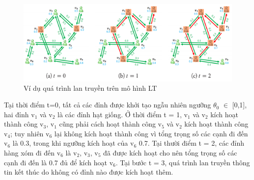 	\begin{center}
		\begin{figure}[H]
			\begin{center}
				\includegraphics [scale=1]{picture/Hinh2_2}
			\end{center}
			\caption{Ví dụ quá trình lan truyền trên mô hình LT}
			\label{refhinh2_2}
		\end{figure}
	\end{center}	
	Tại thời điểm t=0, tất cả các đỉnh được khởi tạo ngẫu nhiên ngưỡng $\theta$$_{0}$ $\in$ [0,1], hai đỉnh v$_{1}$ và v$_{2}$ là các đỉnh hạt giống. Ở thời điểm t = 1, v$_{1}$ và v$_{2}$ kích hoạt thành công v$_{3}$, v$_{1}$ cũng phải cách hoạt thành công v$_{5}$ và v$_{2}$ kích hoạt thành công v$_{4}$; tuy nhiên v$_{6}$ lại không kích hoạt thành công vì tổng trọng số các cạnh đi đến v$_{6}$ là 0.3, trong khi ngưỡng kích hoạt của v$_{6}$ 0.7. Tại thười điểm t = 2, các đỉnh hàng xóm đi đến v$_{6}$ là v$_{2}$, v$_{3}$, v$_{5}$ đã được kích hoạt cho nên tổng trọng số các cạnh đi đến là 0.7 đủ để kích hoạt v$_{6}$. Tại bước t = 3, quá trình lan truyền thông tin kết thúc do không có đỉnh nào được kích hoạt thêm.

